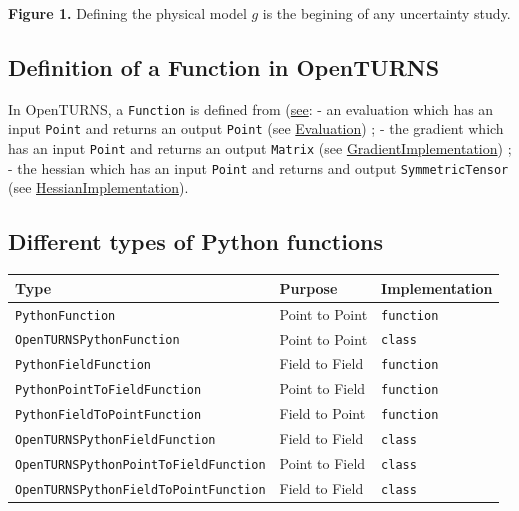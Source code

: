 \documentclass[11pt]{article}
\begin{document}
\textbf{Figure 1.} Defining the physical model \(g\) is the begining of
any uncertainty study.

    \hypertarget{definition-of-a-function-in-openturns}{%
\subsection{Definition of a Function in
OpenTURNS}\label{definition-of-a-function-in-openturns}}

In OpenTURNS, a \texttt{Function} is defined from
(\href{https://github.com/openturns/openturns/blob/18146c0a82819c3f8d8e691a119a93c155429422/lib/src/Base/Func/openturns/Function.hxx\#L74}{see}:
- an evaluation which has an input \texttt{Point} and returns an output
\texttt{Point} (see
\href{https://github.com/openturns/openturns/blob/18146c0a82819c3f8d8e691a119a93c155429422/lib/src/Base/Func/openturns/Evaluation.hxx\#L83}{Evaluation})
; - the gradient which has an input \texttt{Point} and returns an output
\texttt{Matrix} (see
\href{https://github.com/openturns/openturns/blob/18146c0a82819c3f8d8e691a119a93c155429422/lib/src/Base/Func/openturns/GradientImplementation.hxx\#L82}{GradientImplementation})
; - the hessian which has an input \texttt{Point} and returns and output
\texttt{SymmetricTensor} (see
\href{https://github.com/openturns/openturns/blob/18146c0a82819c3f8d8e691a119a93c155429422/lib/src/Base/Func/openturns/HessianImplementation.hxx\#L79}{HessianImplementation}).

    \hypertarget{different-types-of-python-functions}{%
\subsection{Different types of Python
functions}\label{different-types-of-python-functions}}

\begin{longtable}[]{@{}lll@{}}
\toprule()
Type & Purpose & Implementation \\
\midrule()
\endhead
\texttt{PythonFunction} & Point to Point & \texttt{function} \\
\texttt{OpenTURNSPythonFunction} & Point to Point & \texttt{class} \\
\texttt{PythonFieldFunction} & Field to Field & \texttt{function} \\
\texttt{PythonPointToFieldFunction} & Point to Field &
\texttt{function} \\
\texttt{PythonFieldToPointFunction} & Field to Point &
\texttt{function} \\
\texttt{OpenTURNSPythonFieldFunction} & Field to Field &
\texttt{class} \\
\texttt{OpenTURNSPythonPointToFieldFunction} & Point to Field &
\texttt{class} \\
\texttt{OpenTURNSPythonFieldToPointFunction} & Field to Field &
\texttt{class} \\
\bottomrule()
\end{longtable}
\end{document}
